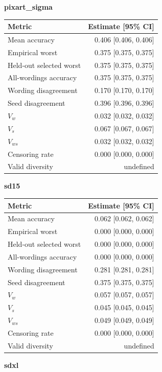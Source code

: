 \textbf{pixart\_sigma}\
\begin{tabular}{@{}lr@{}}
\toprule
Metric & Estimate [95\% CI] \\
\midrule
Mean accuracy & 0.406 [0.406, 0.406] \\
Empirical worst & 0.375 [0.375, 0.375] \\
Held-out selected worst & 0.375 [0.375, 0.375] \\
All-wordings accuracy & 0.375 [0.375, 0.375] \\
Wording disagreement & 0.170 [0.170, 0.170] \\
Seed disagreement & 0.396 [0.396, 0.396] \\
$V_w$ & 0.032 [0.032, 0.032] \\
$V_s$ & 0.067 [0.067, 0.067] \\
$V_{ws}$ & 0.032 [0.032, 0.032] \\
Censoring rate & 0.000 [0.000, 0.000] \\
Valid diversity & undefined \\
\bottomrule
\end{tabular}\par\medskip
\textbf{sd15}\
\begin{tabular}{@{}lr@{}}
\toprule
Metric & Estimate [95\% CI] \\
\midrule
Mean accuracy & 0.062 [0.062, 0.062] \\
Empirical worst & 0.000 [0.000, 0.000] \\
Held-out selected worst & 0.000 [0.000, 0.000] \\
All-wordings accuracy & 0.000 [0.000, 0.000] \\
Wording disagreement & 0.281 [0.281, 0.281] \\
Seed disagreement & 0.375 [0.375, 0.375] \\
$V_w$ & 0.057 [0.057, 0.057] \\
$V_s$ & 0.045 [0.045, 0.045] \\
$V_{ws}$ & 0.049 [0.049, 0.049] \\
Censoring rate & 0.000 [0.000, 0.000] \\
Valid diversity & undefined \\
\bottomrule
\end{tabular}\par\medskip
\textbf{sdxl}\

